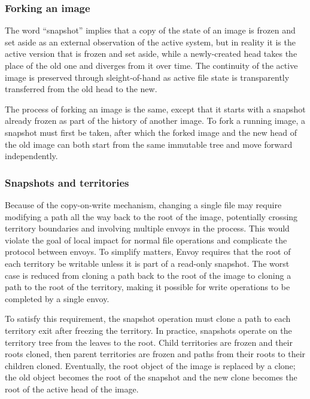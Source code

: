 \subsubsection{Forking an image}

The word ``snapshot'' implies that a copy of the state of an image is frozen and set aside as an external observation of the active system, but in reality it is the active version that is frozen and set aside, while a newly-created head takes the place of the old one and diverges from it over time. The continuity of the active image is preserved through sleight-of-hand as active file state is transparently transferred from the old head to the new.

The process of forking an image is the same, except that it starts with a snapshot already frozen as part of the history of another image. To fork a running image, a snapshot must first be taken, after which the forked image and the new head of the old image can both start from the same immutable tree and move forward independently.

\subsubsection{Snapshots and territories}

Because of the copy-on-write mechanism, changing a single file may require modifying a path all the way back to the root of the image, potentially crossing territory boundaries and involving multiple envoys in the process. This would violate the goal of local impact for normal file operations and complicate the protocol between envoys. To simplify matters, Envoy requires that the root of each territory be writable unless it is part of a read-only snapshot. The worst case is reduced from cloning a path back to the root of the image to cloning a path to the root of the territory, making it possible for write operations to be completed by a single envoy.

To satisfy this requirement, the snapshot operation must clone a path to each territory exit after freezing the territory. In practice, snapshots operate on the territory tree from the leaves to the root. Child territories are frozen and their roots cloned, then parent territories are frozen and paths from their roots to their children cloned. Eventually, the root object of the image is replaced by a clone; the old object becomes the root of the snapshot and the new clone becomes the root of the active head of the image.

